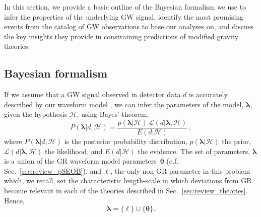 In this section, we provide a basic outline of the Bayesian formalism we use to
infer the properties of the underlying GW signal, identify the most promising
events from the catalog of GW observations to base our analyses on, and discuss
the key insights they provide in constraining predictions of modified gravity
theories.

\subsection{Bayesian formalism}
If we assume that a GW signal observed in detector data $d$ is accurately
described by our waveform model \pSEOB{}, we can infer the parameters of the
model, $\bm{\lambda}$, given the hypothesis $\mathcal{H}$, using Bayes' theorem,
%
\begin{equation}
P(\bm{\lambda} \vert d, \mathcal{H}) =
\frac{p(\bm{\lambda} \vert \mathcal{H}) \, \mathcal{L}(d \vert \bm{\lambda},\mathcal{H})}{E(d \vert \mathcal{H})}\,,
\label{eq:bayes}
\end{equation}
%
where $P(\bm{\lambda} \vert d, \mathcal{H})$ is the posterior probability distribution,
$p(\bm{\lambda} \vert \mathcal{H})$ the prior,
$\mathcal{L}(d \vert \bm{\lambda},\mathcal{H})$ the likelihood, and
$E(d \vert \mathcal{H})$ the evidence.
%
The set of parameters, $\bm{\lambda}$ is a union of the GR waveform
model parameters~$\bm{\theta}$ (c.f.  Sec.~\ref{sec:review_pSEOB}), and
$\ell$,  the only non-GR parameter in this problem which, we recall, set
the characteristic length-scale in which deviations from
GR become relevant in each of the theories described in
Sec.~\ref{sec:review_theories}. Hence,
%
\begin{equation}
\bm{\lambda} = \{\ell\} \cup \{\bm{\theta}\}.
\label{eq:def_params}
\end{equation}


